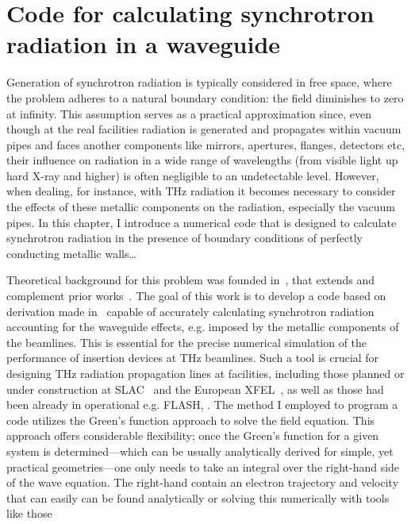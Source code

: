 \chapter{Code for calculating synchrotron radiation in a waveguide}
\label{chapter:Synchrotron_radiation_in_a_wave_guide}

    
    Generation of synchrotron radiation is typically considered in free space, where the problem adheres to a natural boundary condition: the field diminishes to zero at infinity. This assumption serves as a practical approximation since, even though at the real facilities radiation is generated and propagates within vacuum pipes and faces another components like mirrors, apertures, flanges, detectors etc, their influence on radiation in a wide range of wavelengths (from visible light up hard X-ray and higher) is often negligible to an undetectable level. However, when dealing, for instance, with THz radiation it becomes necessary to consider the effects of these metallic components on the radiation, especially the vacuum pipes. In this chapter, I introduce a numerical code that is designed to calculate synchrotron radiation in the presence of boundary conditions of perfectly conducting metallic walls… 
    
    Theoretical background for this problem was founded in~, that extends and complement prior works~. The goal of this work is to develop a code based on derivation made in~ capable of accurately calculating synchrotron radiation accounting for the waveguide effects, e.g. imposed by the metallic components of the beamlines. This is essential for the precise numerical simulation of the performance of insertion devices at THz beamlines. Such a tool is crucial for designing THz radiation propagation lines at facilities, including those planned or under construction at SLAC~ and the European XFEL~, as well as those had been already in operational e.g. FLASH, . The method I employed to program a code utilizes the Green's function approach to solve the field equation. This approach offers considerable flexibility; once the Green's function for a given system is determined—which can be usually analytically derived for simple, yet practical geometries—one only needs to take an integral over the right-hand side of the wave equation. The right-hand contain an electron trajectory and velocity that can easily can be found analytically or solving this numerically with tools like those~
    
